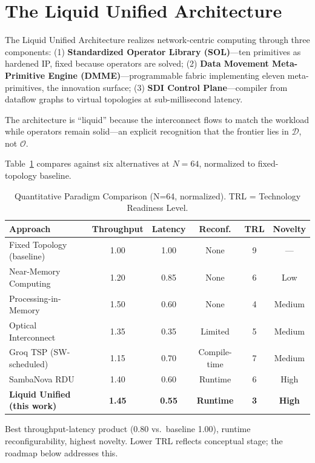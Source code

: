 ﻿\documentclass[review,3p,twocolumn]{elsarticle}
\begin{document}
\section{The Liquid Unified Architecture}
\label{sec:liquid}

The Liquid Unified Architecture realizes network-centric computing through three components: (1) \textbf{Standardized Operator Library (SOL)}---ten primitives as hardened IP, fixed because operators are solved; (2) \textbf{Data Movement Meta-Primitive Engine (DMME)}---programmable fabric implementing eleven meta-primitives, the innovation surface; (3) \textbf{SDI Control Plane}---compiler from dataflow graphs to virtual topologies at sub-millisecond latency.

The architecture is ``liquid'' because the interconnect flows to match the workload while operators remain solid---an explicit recognition that the frontier lies in $\mathcal{D}$, not $\mathcal{O}$.

Table~\ref{tab:paradigms} compares against six alternatives at $N=64$, normalized to fixed-topology baseline.

\begin{table}[h]
\centering
\caption{Quantitative Paradigm Comparison (N=64, normalized). TRL = Technology Readiness Level.}
\label{tab:paradigms}
\begin{tabular}{lccccc}
\toprule
\textbf{Approach} & \textbf{Throughput} & \textbf{Latency} & \textbf{Reconf.} & \textbf{TRL} & \textbf{Novelty} \\
\midrule
Fixed Topology (baseline) & 1.00 & 1.00 & None & 9 & --- \\
Near-Memory Computing~\cite{fowers2018} & 1.20 & 0.85 & None & 6 & Low \\
Processing-in-Memory~\cite{nature2026} & 1.50 & 0.60 & None & 4 & Medium \\
Optical Interconnect~\cite{lightmatter2025} & 1.35 & 0.35 & Limited & 5 & Medium \\
Groq TSP (SW-scheduled)~\cite{groq2024} & 1.15 & 0.70 & Compile-time & 7 & Medium \\
SambaNova RDU~\cite{sambanova2026} & 1.40 & 0.60 & Runtime & 6 & High \\
\textbf{Liquid Unified (this work)} & \textbf{1.45} & \textbf{0.55} & \textbf{Runtime} & \textbf{3} & \textbf{High} \\
\bottomrule
\end{tabular}
\end{table}

Best throughput-latency product (0.80 vs.\ baseline 1.00), runtime reconfigurability, highest novelty. Lower TRL reflects conceptual stage; the roadmap below addresses this.
\end{document}

